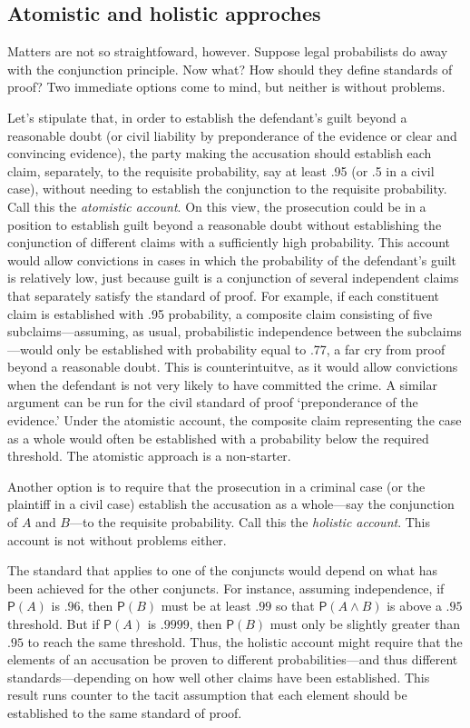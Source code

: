 \documentclass[
  10pt,
  dvipsnames,enabledeprecatedfontcommands]{scrartcl}
\newcommand{\et}{\wedge}
\newcommand{\pr}[1]{\mathsf{P}(#1)}
\begin{document}
\hypertarget{atomistic-and-holistic-approches}{%
\subsection{Atomistic and holistic
approches}\label{atomistic-and-holistic-approches}}

Matters are not so straightfoward, however. Suppose legal probabilists
do away with the conjunction principle. Now what? How should they define
standards of proof? Two immediate options come to mind, but neither is
without problems.

Let's stipulate that, in order to establish the defendant's guilt beyond
a reasonable doubt (or civil liability by preponderance of the evidence
or clear and convincing evidence), the party making the accusation
should establish each claim, separately, to the requisite probability,
say at least .95 (or .5 in a civil case), without needing to establish
the conjunction to the requisite probability. Call this the
\textit{atomistic account}. On this view, the prosecution could be in a
position to establish guilt beyond a reasonable doubt without
establishing the conjunction of different claims with a sufficiently
high probability. This account would allow convictions in cases in which
the probability of the defendant's guilt is relatively low, just because
guilt is a conjunction of several independent claims that separately
satisfy the standard of proof. For example, if each constituent claim is
established with .95 probability, a composite claim consisting of five
subclaims---assuming, as usual, probabilistic independence between the
subclaims---would only be established with probability equal to .77, a
far cry from proof beyond a reasonable doubt. This is counterintuitve,
as it would allow convictions when the defendant is not very likely to
have committed the crime. A similar argument can be run for the civil
standard of proof `preponderance of the evidence.' Under the atomistic
account, the composite claim representing the case as a whole would
often be established with a probability below the required threshold.
The atomistic approach is a non-starter.

Another option is to require that the prosecution in a criminal case (or
the plaintiff in a civil case) establish the accusation as a whole---say
the conjunction of \(A\) and \(B\)---to the requisite probability. Call
this the \textit{holistic account}. This account is not without problems
either.

The standard that applies to one of the conjuncts would depend on what
has been achieved for the other conjuncts. For instance, assuming
independence, if \(\pr{A}\) is \(.96\), then \(\pr{B}\) must be at least
\(.99\) so that \(\pr{A\et B}\) is above a \(.95\) threshold. But if
\(\pr{A}\) is \(.9999\), then \(\pr{B}\) must only be slightly greater
than \(.95\) to reach the same threshold. Thus, the holistic account
might require that the elements of an accusation be proven to different
probabilities---and thus different standards---depending on how well
other claims have been established. This result runs counter to the
tacit assumption that each element should be established to the same
standard of proof.
\end{document}
